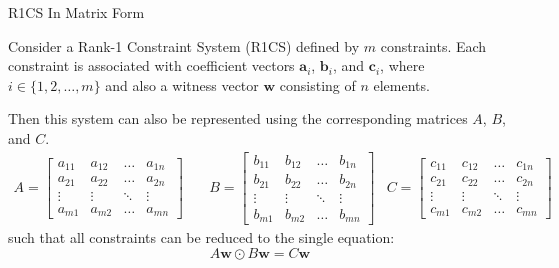 \documentclass{beamer}
\begin{document}
    \begin{frame}{R1CS In Matrix Form}
        \begin{theorem} 
            Consider a Rank-1 Constraint System (R1CS) defined by $m$ constraints. Each constraint is
            associated with coefficient vectors $\mathbf{a}_i$, $\mathbf{b}_i$, and $\mathbf{c}_i$, where $i \in \{1, 2, \dots, m\}$ and
            also a witness vector $\mathbf{w}$ consisting of $n$ elements.
        
            Then this system can also be represented using the corresponding matrices $A$, $B$, and $C$.
            {\scriptsize
            \begin{align*}
                A = \begin{bmatrix}
                    a_{11} & a_{12} & \dots & a_{1n} \\
                    a_{21} & a_{22} & \dots & a_{2n} \\
                    \vdots & \vdots & \ddots & \vdots \\
                    a_{m1} & a_{m2} & \dots & a_{mn}
                \end{bmatrix} & \quad
                B = \begin{bmatrix}
                    b_{11} & b_{12} & \dots & b_{1n} \\
                    b_{21} & b_{22} & \dots & b_{2n} \\
                    \vdots & \vdots & \ddots & \vdots \\
                    b_{m1} & b_{m2} & \dots & b_{mn}
                \end{bmatrix} & 
                C = \begin{bmatrix}
                    c_{11} & c_{12} & \dots & c_{1n} \\
                    c_{21} & c_{22} & \dots & c_{2n} \\
                    \vdots & \vdots & \ddots & \vdots \\
                    c_{m1} & c_{m2} & \dots & c_{mn}
                \end{bmatrix}
            \end{align*}
            }
            such that all constraints can be reduced to the single equation:
            \begin{equation*}
                A\mathbf{w} \odot B\mathbf{w} = C\mathbf{w}
            \end{equation*}
        \end{theorem}
    \end{frame}
\end{document}
